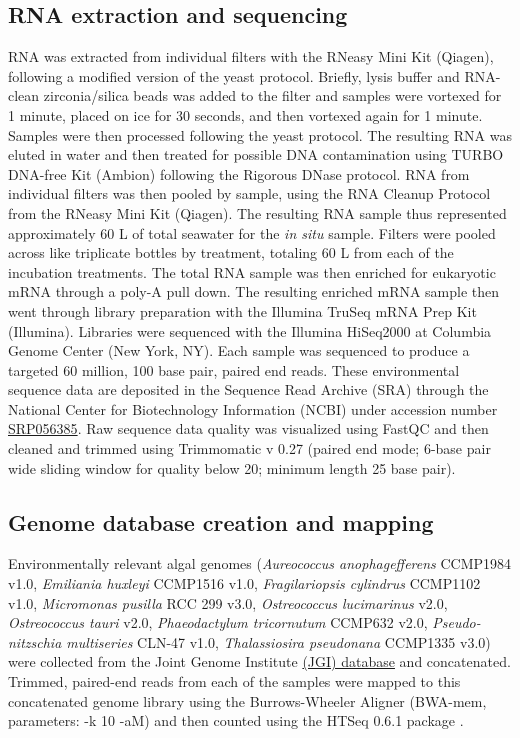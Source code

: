 \subsection{RNA extraction and sequencing}
RNA was extracted from individual filters with the RNeasy Mini Kit (Qiagen), following a modified version of the yeast protocol. Briefly, lysis buffer and RNA-clean zirconia/silica beads was added to the filter and samples were vortexed for 1 minute, placed on ice for 30 seconds, and then vortexed again for 1 minute. Samples were then processed following the yeast protocol. The resulting RNA was eluted in water and then treated for possible DNA contamination using TURBO DNA-free Kit (Ambion) following the Rigorous DNase protocol. RNA from individual filters was then pooled by sample, using the RNA Cleanup Protocol from the RNeasy Mini Kit (Qiagen). The resulting RNA sample thus represented approximately 60 L of total seawater for the \textit{in situ} sample. Filters were pooled across like triplicate bottles by treatment, totaling 60 L from each of the incubation treatments. The total RNA sample was then enriched for eukaryotic mRNA through a poly-A pull down. The resulting enriched mRNA sample then went through library preparation with the Illumina TruSeq mRNA Prep Kit (Illumina). Libraries were sequenced with the Illumina HiSeq2000 at Columbia Genome Center (New York, NY). Each sample was sequenced to produce a targeted 60 million, 100 base pair, paired end reads. These environmental sequence data are deposited in the Sequence Read Archive (SRA) through the National Center for Biotechnology Information (NCBI) under accession number \href{http://google.com}{SRP056385}. Raw sequence data quality was visualized using FastQC and then cleaned and trimmed using Trimmomatic v 0.27 (paired end mode; 6-base pair wide sliding window for quality below 20; minimum length 25 base pair). \par
\subsection{Genome database creation and mapping}
Environmentally relevant algal genomes (\textit{Aureococcus anophagefferens} CCMP1984 v1.0, \textit{Emiliania huxleyi} CCMP1516 v1.0, \textit{Fragilariopsis cylindrus} CCMP1102 v1.0, \textit{Micromonas pusilla} RCC 299 v3.0, \textit{Ostreococcus lucimarinus} v2.0, \textit{Ostreococcus tauri} v2.0, \textit{Phaeodactylum tricornutum} CCMP632 v2.0, \textit{Pseudo-nitzschia multiseries} CLN-47 v1.0, \textit{Thalassiosira pseudonana} CCMP1335 v3.0) were collected from the Joint Genome Institute \href{http://genome.jgi.doe.gov/}{(JGI) database} and concatenated. Trimmed, paired-end reads from each of the samples were mapped to this concatenated genome library using the Burrows-Wheeler Aligner \citep{Li2010} (BWA-mem, parameters: -k 10 -aM) and then counted using the HTSeq 0.6.1 package \citep{Anders2014}.\par 
